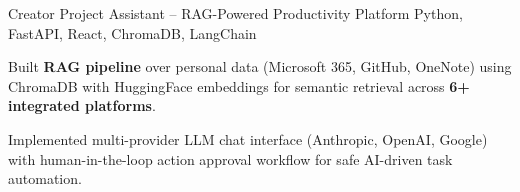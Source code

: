 

\begin{cventries}

  \cventry
    {Creator} %
    {Project Assistant -- RAG-Powered Productivity Platform} %
    {Python, FastAPI, React, ChromaDB, LangChain} %
    {} %
    {
      \begin{cvitems}
        \item {Built \textbf{RAG pipeline} over personal data (Microsoft 365, GitHub, OneNote) using ChromaDB with HuggingFace embeddings for semantic retrieval across \textbf{6+ integrated platforms}.}
        \item {Implemented multi-provider LLM chat interface (Anthropic, OpenAI, Google) with human-in-the-loop action approval workflow for safe AI-driven task automation.}
      \end{cvitems}
    }

\end{cventries}
